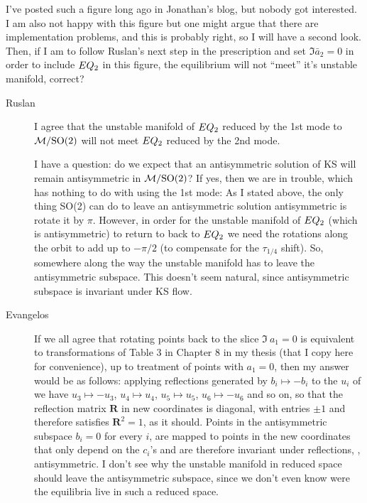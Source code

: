 I've posted such a figure long ago in Jonathan's blog, but
nobody got interested. I am also not happy with this figure
but one might argue that there are implementation problems,
and this is probably right, so I will have a second look.
Then, if I am to follow Ruslan's next step in the
prescription and set $\Im \bar{a}_2 =0$ in order to include
$EQ_{2}$ in this figure, the equilibrium will not ``meet''
it's unstable manifold, correct?

\begin{description}
\item[Ruslan]
 I agree that the unstable manifold of $EQ_{2}$ reduced by
 the 1st mode to ${\cal M}/\textrm{SO}(2)$ will not meet $EQ_{2}$ reduced by
 the 2nd mode. \par I have a question: do we expect that an
 antisymmetric solution of KS will remain antisymmetric in
 ${\cal M}/\textrm{SO}(2)$?  If yes, then we are in trouble, which has
 nothing to do with using the 1st mode: As I stated above,
 the only thing SO(2) can do to leave an antisymmetric
 solution antisymmetric is rotate it by $\pi$.  However, in
 order for the unstable manifold of $EQ_{2}$ (which is
 antisymmetric) to return to back to $EQ_{2}$ we need the
 rotations along the orbit to add up to $-\pi/2$ (to
 compensate for the $\tau_{1/4}$ shift).  So, somewhere along
 the way the unstable manifold has to leave the antisymmetric
 subspace.  This doesn't seem natural, since antisymmetric
 subspace is invariant under KS flow.

\item[Evangelos]
If we all agree that rotating points back to the slice $\Im\
a_1=0$ is equivalent to transformations of Table 3 in Chapter
8 in my thesis (that I copy here for convenience), up to
treatment of points with $a_1=0$, then my answer would be as
follows: applying reflections generated by $b_i\mapsto - b_i$
to the $u_i$ of  we have $u_3\mapsto -u_3$,
$u_4\mapsto u_4$, $u_5\mapsto u_5$, $u_6\mapsto -u_6$ and so
on, so that the reflection matrix $\mathbf{R}$ in new
coordinates is diagonal, with entries $\pm 1$ and therefore
satisfies $\mathbf{R}^2=1$, as it should. Points in the
antisymmetric subspace $b_i=0$ for every $i$, are mapped to
points in the new coordinates that only depend on the $c_i$'s
and are therefore invariant under reflections, \ie,
antisymmetric. I don't see why the unstable manifold in
reduced space should leave the antisymmetric subspace, since
we don't even know were the equilibria live in such a reduced
space.




\end{description}
